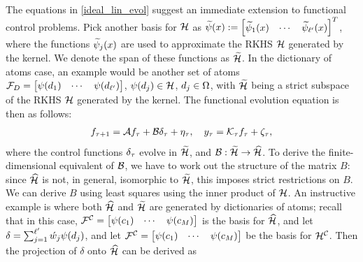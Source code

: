 The equations in \eqref{ideal_lin_evol} suggest an immediate extension to functional control problems. 
Pick another basis for $\mathcal{H}$ as $\widetilde{\psi}(x) := \begin{bmatrix}\widetilde{\psi}_1(x) &\cdots & \widetilde{\psi}_{\ell'}(x)
\end{bmatrix}^T$, where the functions $\widetilde{\psi}_j(x)$ are used to approximate the RKHS $\mathcal{H}$ generated by the kernel. We denote the span of these functions as $\widetilde{\mathcal{H}}$. In the dictionary of atoms case, an example would be another set of atoms
 $\mathcal{F}_{D} = \begin{bmatrix}\psi(d_1) &\cdots & \psi(d_{\ell'})
\end{bmatrix}$, $\psi(d_j)\in\mathcal{H}$, $d_j\in\Omega$, with $\widetilde{\mathcal{H}}$ being a strict subspace of the RKHS $\mathcal{H}$  generated by the kernel. 
The functional evolution equation is then as follows:
\begin{align}\eqlabel{ideal_lin_evol_control}
 f_{\tindex+1} = \sysop f_{\tindex} + \controlop \control_{\tindex} + \eta_{\tindex}, \quad y_{\tindex} = \measop_{\tindex} f_{\tindex} + \zeta_{\tindex},
\end{align}
where the control functions $\delta_{\tau}$ evolve in $\widetilde{\mathcal{H}}$, and $\mathcal{B}:\widetilde{\mathcal{H}}\to\widehat{\mathcal{H}}$. To derive the finite-dimensional equivalent of $\mathcal{B}$, we have to work out the structure of the matrix $B$: since $\widehat{\mathcal{H}}$ is not, in general, isomorphic to $\widetilde{\mathcal{H}}$, this imposes strict restrictions on $B$. We can derive $B$ using least squares using the inner product of $\mathcal{H}$. An instructive example is where both $\widehat{\mathcal{H}}$ and $\widetilde{\mathcal{H}}$ are generated by dictionaries of atoms; recall that in this case, $\mathcal{F}^{\mathcal{C}} = 
 \begin{bmatrix}\psi(c_1) &\cdots & \psi(c_{M})
\end{bmatrix}$ is the basis for $\widehat{\mathcal{H}}$, and let $\delta = \sum_{j=1}^{\ell'}\acute{w}_j\psi(d_j)$, and let $\mathcal{F}^{\mathcal{C}} = 
 \begin{bmatrix}\psi(c_1) &\cdots & \psi(c_{M})
\end{bmatrix}$ be the basis for $\mathcal{H}^{\mathcal{C}}$. Then the projection of $\delta$ onto $\widehat{\mathcal{H}}$ can be derived as 
